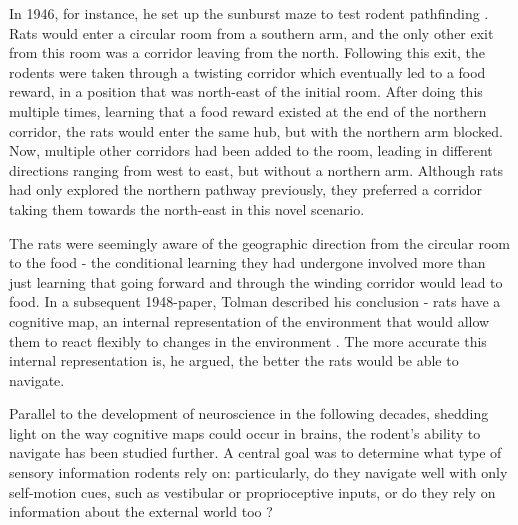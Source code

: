 \documentclass{article}
\begin{document}
    In 1946, for instance, he set up the sunburst maze to test rodent pathfinding \parencite{Tolman1946}. Rats would enter a circular room from a southern arm, and the only other exit from this room was a corridor leaving from the north. Following this exit, the rodents were taken through a twisting corridor which eventually led to a food reward, in a position that was north-east of the initial room. After doing this multiple times, learning that a food reward existed at the end of the northern corridor, the rats would enter the same hub, but with the northern arm blocked. Now, multiple other corridors had been added to the room, leading in different directions ranging from west to east, but without a northern arm. Although rats had only explored the northern pathway previously, they preferred a corridor taking them towards the north-east in this novel scenario. 
    
    The rats were seemingly aware of the geographic direction from the circular room to the food - the conditional learning they had undergone involved more than just learning that going forward and through the winding corridor would lead to food. In a subsequent 1948-paper, Tolman described his conclusion - rats have a cognitive map, an internal representation of the environment that would allow them to react flexibly to changes in the environment \parencite{Tolman1948}. The more accurate this internal representation is, he argued, the better the rats would be able to navigate.

    Parallel to the development of neuroscience in the following decades, shedding light on the way cognitive maps could occur in brains, the rodent's ability to navigate has been studied further. A central goal was to determine what type of sensory information rodents rely on: particularly, do they navigate well with only self-motion cues, such as vestibular or proprioceptive inputs, or do they rely on information about the external world too \parencite{Dudchenko2010}?
\end{document}
